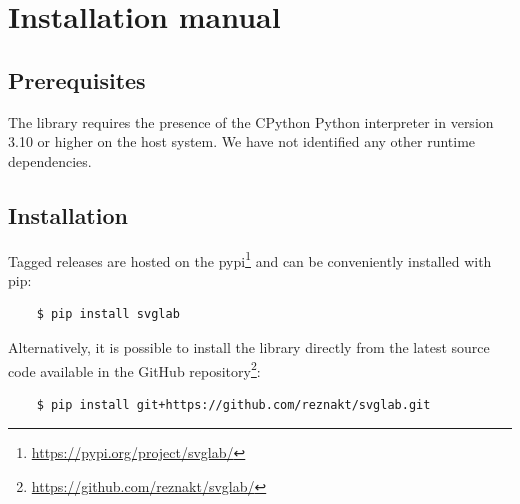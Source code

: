 \chapter{Installation manual}\label{appx:installation}

\section{Prerequisites}

The library requires the presence of the CPython Python interpreter in version 3.10 or higher on the host system. We have not identified any other runtime dependencies.

\section{Installation}

Tagged releases are hosted on the \gls{pypi}\footnote{\url{https://pypi.org/project/svglab/}} and can be conveniently installed with pip:
\begin{verbatim}
    $ pip install svglab
\end{verbatim}

Alternatively, it is possible to install the library directly from the latest source code available in the GitHub repository\footnote{\url{https://github.com/reznakt/svglab/}}:
\begin{verbatim}
    $ pip install git+https://github.com/reznakt/svglab.git
\end{verbatim}
